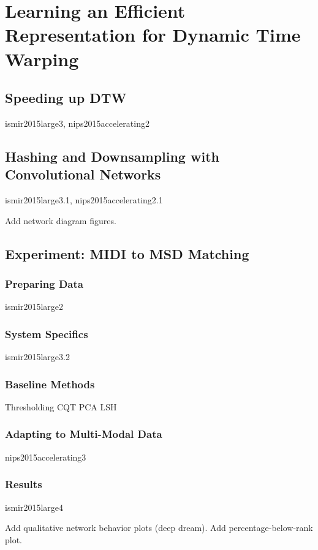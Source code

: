\chapter{Learning an Efficient Representation for Dynamic Time Warping}

\section{Speeding up DTW}

ismir2015large3, nips2015accelerating2

\section{Hashing and Downsampling with Convolutional Networks}

ismir2015large3.1, nips2015accelerating2.1

Add network diagram figures.

\section{Experiment: MIDI to MSD Matching}

\subsection{Preparing Data}

ismir2015large2

\subsection{System Specifics}

ismir2015large3.2

\subsection{Baseline Methods}

Thresholding CQT PCA
LSH

\subsection{Adapting to Multi-Modal Data}

nips2015accelerating3

\subsection{Results}

ismir2015large4

Add qualitative network behavior plots (deep dream).
Add percentage-below-rank plot.
